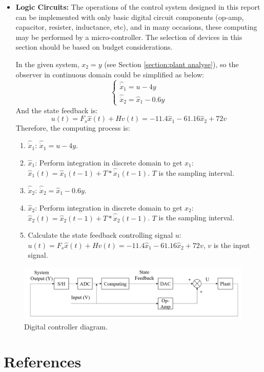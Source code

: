 \documentclass[12pt, oneside]{article}
\begin{document}
\begin{itemize}
    \item \textbf{Logic Circuits:} The operations of the control system designed in this report can be implemented with only basic digital circuit components (op-amp, capacitor, resister, inductance, etc), and in many occasions, these computing may be performed by a micro-controller. The selection of devices in this section should be based on budget considerations.

    In the given system, $x_2=y$ (see Section \ref{section:plant analyse}), so the observer in continuous domain could be simplified as below:
    \begin{equation}
        \begin{cases}
            \hat{\dot{x}}_1 = u-4y\\
            \hat{\dot{x}}_2 = \hat{x}_1-0.6y
        \end{cases}
    \end{equation}
    And the state feedback is:
    \begin{equation}
        u(t) = F_s\hat{x}(t)+Hv(t) = -11.4 \hat{x}_1-61.16 \hat{x}_2+72v
    \end{equation}
    Therefore, the computing process is:
    \begin{enumerate}
        \item $\hat{\dot{x}}_1$: $\hat{\dot{x}}_1 = u-4y$. 
        \item $\hat{x}_1$: Perform integration  in discrete domain to get $\hat{x}_1$: $\hat{x}_1(t) = \hat{x}_1(t-1)+T*\hat{\dot{x}}_1(t-1)$. $T$ is the sampling interval.
        \item $\hat{\dot{x}}_2$:  $\hat{\dot{x}}_2 = \hat{x}_1-0.6y$. 
        \item $\hat{x}_2$: Perform integration  in discrete domain to get $\hat{x}_2$: $\hat{x}_2(t) = \hat{x}_2(t-1)+T*\hat{\dot{x}}_2(t-1)$. $T$ is the sampling interval.
        \item Calculate the state feedback controlling signal $u$: $u(t) = F_s\hat{x}(t)+Hv(t) = -11.4 \hat{x}_1-61.16 \hat{x}_2+72v$, $v$ is the input signal.
    \end{enumerate}
    
\end{itemize}

\begin{figure}[htbp]
    \centering
    \includegraphics[width = \linewidth]{Report/pics/DigitalDesign.png}
    \caption{Digital controller diagram.}
    \label{fig:my_label}
\end{figure}
\FloatBarrier


\section{References}



\end{document}
